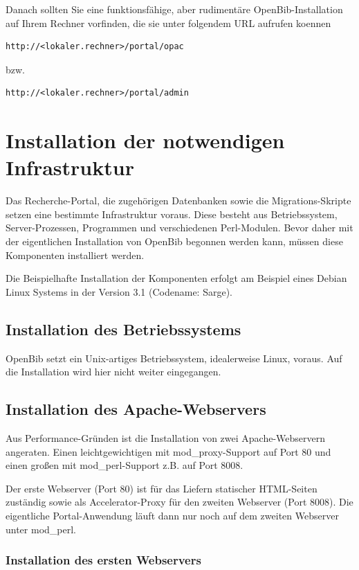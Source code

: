 \documentclass[11pt, twoside, a4paper, BCOR8mm, DIV12, bibtotoc,idxtotoc]{scrbook}
\begin{document}
Danach sollten Sie eine funktionsfähige, aber rudimentäre
OpenBib-Installation auf Ihrem Rechner vorfinden, die sie unter
folgendem URL aufrufen koennen

\begin{verbatim}
http://<lokaler.rechner>/portal/opac
\end{verbatim}

bzw. 

\begin{verbatim}
http://<lokaler.rechner>/portal/admin
\end{verbatim}

\chapter{Installation der notwendigen Infrastruktur}
Das Recherche-Portal, die zugehörigen Datenbanken sowie die
Migrations-Skripte setzen eine bestimmte Infrastruktur voraus. Diese
besteht aus Betriebssystem, Server-Prozessen, Programmen und
verschiedenen Perl-Modulen. Bevor daher mit der eigentlichen
Installation von OpenBib begonnen werden kann, müssen diese
Komponenten installiert werden.

Die Beispielhafte Installation der Komponenten erfolgt am Beispiel
eines Debian Linux Systems in der Version 3.1 (Codename: Sarge).


\section{Installation des Betriebssystems}
OpenBib setzt ein Unix-artiges Betriebssystem, idealerweise Linux,
voraus. Auf die Installation wird hier nicht weiter eingegangen.


\section{Installation des Apache-Webservers}
Aus Performance-Gründen ist die Installation von zwei
Apache-Webservern angeraten. Einen leichtgewichtigen mit
mod\_proxy-Support auf Port 80 und einen großen mit mod\_perl-Support
z.B. auf Port 8008. 

Der erste Webserver (Port 80) ist für das Liefern statischer
HTML-Seiten zuständig sowie als Accelerator-Proxy für den zweiten
Webserver (Port 8008). Die eigentliche Portal-Anwendung läuft dann
nur noch auf dem zweiten Webserver unter mod\_perl.


\subsection{Installation des ersten Webservers}
\end{document}
